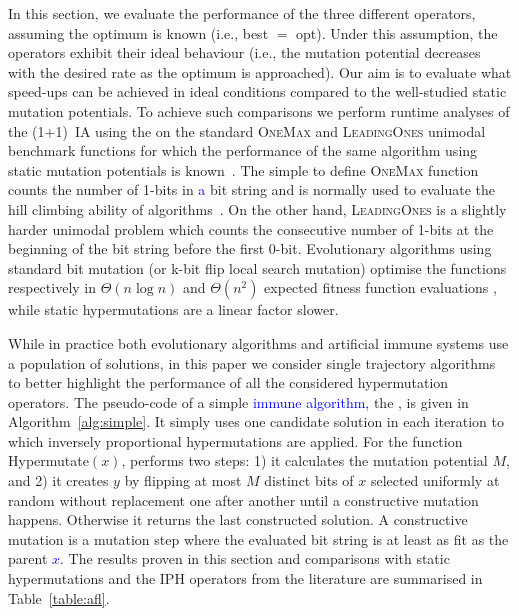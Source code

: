 \documentclass[lettersize,journal]{IEEEtran}
\newcommand{\new}[1]{\textcolor{blue}{#1}}
\begin{document}
In this section, we evaluate the performance of the three different \IPHfcm{} operators, %
assuming the optimum is known (i.e., best $=$ opt). Under this assumption, the operators exhibit their ideal behaviour (i.e., the mutation potential decreases with the desired rate as the optimum is approached).
Our aim is to evaluate what speed-ups can be achieved in ideal conditions compared to the well-studied static mutation potentials. To achieve such comparisons we perform runtime analyses of the (1+1)~IA  using the \IPHfcm{} on the standard \textsc{OneMax} and \textsc{LeadingOnes} unimodal benchmark functions for which the performance of the same algorithm using static mutation potentials is known~\cite{CorusOlivetoYazdani2019TCS}. The simple to define \textsc{OneMax} function counts the number of 1-bits in \new{a} bit string and is normally used to evaluate the hill climbing ability of algorithms~\cite{LehrTEVC2018,CorusOlivetoTEVCsteadyGA2017,CorusOlivetoAlgo2020,DoerrDoerrEbel2015}. On the other hand, \textsc{LeadingOnes} is a slightly harder unimodal problem which counts the consecutive number of 1-bits at the beginning of the bit string before the first 0-bit. 
Evolutionary algorithms using standard bit mutation (or k-bit flip local search mutation) optimise the functions respectively in $\Theta(n \log n)$ and $\Theta(n^2)$ expected fitness function evaluations \cite{DrosteJansenWegener2002,BoettcherEtAl2010,DoerrEtAl2016B,LissovoiOlivetoWarwicker2020,DLOW2018}, while static hypermutations are a linear factor slower\cite{CorusOlivetoYazdani2019TCS}.

While in practice both evolutionary algorithms and artificial immune systems use a population of solutions, in this paper we consider single trajectory algorithms to better highlight the performance of all the considered hypermutation operators.
The pseudo-code of a simple \new{immune algorithm,} the \oneoneIA{}, is given in Algorithm~\ref{alg:simple}. It simply uses one candidate solution in each iteration to which inversely proportional hypermutations are applied. For the function Hypermutate$(x)$, \IPHfcm{} performs two steps: 
1) it calculates the mutation potential $M$, and 2) it creates $y$ by flipping at most $M$ distinct bits of $x$ selected uniformly at random without replacement one after another until a constructive mutation happens. Otherwise it returns the last constructed solution. A  constructive mutation is a mutation step where the evaluated bit string is at least as fit as the parent \new{$x$}. 
%
The results proven in this section and comparisons with static hypermutations and the IPH operators from the literature are summarised in Table~\ref{table:afl}.
\end{document}
